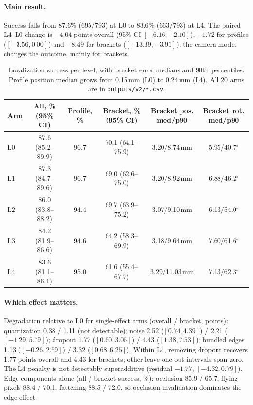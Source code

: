 \documentclass[10pt]{article}
\begin{document}
\paragraph{Main result.}
Success falls from 87.6\% (695/793) at L0 to 83.6\% (663/793) at L4. The paired L4--L0 change is $-4.04$ points overall (95\% CI $[-6.16,-2.10]$), $-1.72$ for profiles ($[-3.56,0.00]$) and $-8.49$ for brackets ($[-13.39,-3.91]$): the camera model changes the outcome, mainly for brackets.

\begin{table}[ht]
\centering
\footnotesize
\begin{tabular}{@{}lccccc@{}}
\toprule
Arm & All, \% (95\% CI) & Profile, \% & Bracket, \% (95\% CI) & Bracket pos. med/p90 & Bracket rot. med/p90 \\
\midrule
L0 & 87.6 (85.2--89.9) & 96.7 & 70.1 (64.1--75.9) & 3.20/8.74\,mm & 5.95/40.7$^\circ$ \\
L1 & 87.3 (84.7--89.6) & 96.7 & 69.0 (62.6--75.0) & 3.20/8.92\,mm & 6.88/46.2$^\circ$ \\
L2 & 86.0 (83.8--88.2) & 94.4 & 69.7 (63.9--75.2) & 3.07/9.10\,mm & 6.13/54.0$^\circ$ \\
L3 & 84.2 (81.9--86.6) & 94.6 & 64.2 (58.3--69.9) & 3.18/9.64\,mm & 7.60/61.6$^\circ$ \\
L4 & 83.6 (81.1--86.1) & 95.0 & 61.6 (55.4--67.7) & 3.29/11.03\,mm & 7.13/62.3$^\circ$ \\
\bottomrule
\end{tabular}
\caption{Localization success per level, with bracket error medians and 90th percentiles. Profile position median grows from 0.15\,mm (L0) to 0.24\,mm (L4). All 20 arms are in \texttt{outputs/v2/*.csv}.}
\label{tab:main}
\end{table}

\paragraph{Which effect matters.}
Degradation relative to L0 for single-effect arms (overall / bracket, points): quantization 0.38 / 1.11 (not detectable); noise 2.52 ($[0.74,4.39]$) / 2.21 ($[-1.29,5.79]$); dropout 1.77 ($[0.60,3.05]$) / 4.43 ($[1.38,7.53]$); bundled edges 1.13 ($[-0.26,2.59]$) / 3.32 ($[0.68,6.25]$). Within L4, removing dropout recovers 1.77 points overall and 4.43 for brackets; other leave-one-out intervals span zero. The L4 penalty is not detectably superadditive (residual $-1.77$, $[-4.32,0.79]$). Edge components alone (all / bracket success, \%): occlusion 85.9 / 65.7, flying pixels 88.4 / 70.1, fattening 88.5 / 72.0, so occlusion invalidation dominates the edge effect.
\end{document}
